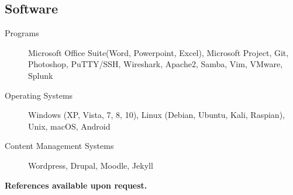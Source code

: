 \documentclass{article}
\begin{document}
\begin{samepage}
\subsection{Software}

\begin{description}
\item[Programs] Microsoft Office Suite(Word, Powerpoint, Excel), Microsoft Project, Git, Photoshop, PuTTY/SSH, Wireshark, Apache2, Samba, Vim, VMware, Splunk
\item[Operating Systems] Windows (XP, Vista, 7, 8, 10), Linux (Debian, Ubuntu, Kali, Raspian), Unix,  macOS, Android 
\item[Content Management Systems] Wordpress, Drupal, Moodle, Jekyll
\end{description}


\begin{center}
\textbf{References available upon request.}
\end{center}

\end{samepage}
\end{document}
